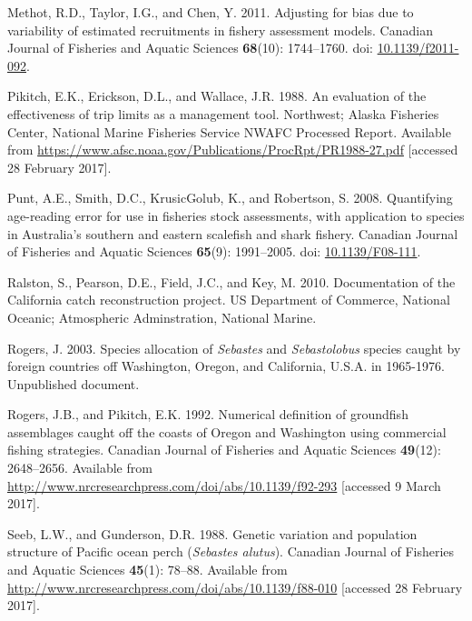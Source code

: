 \documentclass[12pt,]{article}
\begin{document}
\hypertarget{ref-methot_adjusting_2011}{}
Methot, R.D., Taylor, I.G., and Chen, Y. 2011. Adjusting for bias due to
variability of estimated recruitments in fishery assessment models.
Canadian Journal of Fisheries and Aquatic Sciences \textbf{68}(10):
1744--1760. doi:
\href{https://doi.org/10.1139/f2011-092}{10.1139/f2011-092}.

\hypertarget{ref-pikitch_evaluation_1988}{}
Pikitch, E.K., Erickson, D.L., and Wallace, J.R. 1988. An evaluation of
the effectiveness of trip limits as a management tool. Northwest; Alaska
Fisheries Center, National Marine Fisheries Service NWAFC Processed
Report. Available from
\url{https://www.afsc.noaa.gov/Publications/ProcRpt/PR1988-27.pdf}
{[}accessed 28 February 2017{]}.

\hypertarget{ref-punt_quantifying_2008}{}
Punt, A.E., Smith, D.C., KrusicGolub, K., and Robertson, S. 2008.
Quantifying age-reading error for use in fisheries stock assessments,
with application to species in Australia's southern and eastern
scalefish and shark fishery. Canadian Journal of Fisheries and Aquatic
Sciences \textbf{65}(9): 1991--2005. doi:
\href{https://doi.org/10.1139/F08-111}{10.1139/F08-111}.

\hypertarget{ref-ralston_documentation_2010}{}
Ralston, S., Pearson, D.E., Field, J.C., and Key, M. 2010. Documentation
of the California catch reconstruction project. US Department of
Commerce, National Oceanic; Atmospheric Adminstration, National Marine.

\hypertarget{ref-rogers_species_2003}{}
Rogers, J. 2003. Species allocation of \emph{Sebastes} and
\emph{Sebastolobus} species caught by foreign countries off Washington,
Oregon, and California, U.S.A. in 1965-1976. Unpublished document.

\hypertarget{ref-rogers_numerical_1992}{}
Rogers, J.B., and Pikitch, E.K. 1992. Numerical definition of groundfish
assemblages caught off the coasts of Oregon and Washington using
commercial fishing strategies. Canadian Journal of Fisheries and Aquatic
Sciences \textbf{49}(12): 2648--2656. Available from
\url{http://www.nrcresearchpress.com/doi/abs/10.1139/f92-293}
{[}accessed 9 March 2017{]}.

\hypertarget{ref-seeb_genetic_1988}{}
Seeb, L.W., and Gunderson, D.R. 1988. Genetic variation and population
structure of Pacific ocean perch (\emph{Sebastes alutus}). Canadian
Journal of Fisheries and Aquatic Sciences \textbf{45}(1): 78--88.
Available from
\url{http://www.nrcresearchpress.com/doi/abs/10.1139/f88-010}
{[}accessed 28 February 2017{]}.
\end{document}
